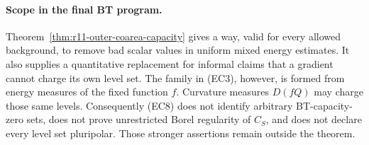 \paragraph{Scope in the final BT program.}
Theorem~\ref{thm:r11-outer-coarea-capacity} gives a way, valid for every allowed background, to remove bad
scalar values in uniform mixed energy estimates.  It also supplies a quantitative replacement
for informal claims that a gradient cannot charge its own
level set.  The family in (EC3), however, is formed from
energy measures of the fixed function $f$.  Curvature measures
$D(fQ)$ may charge those same levels.  Consequently (EC8)
does not identify arbitrary BT-capacity-zero sets, does not
prove unrestricted Borel regularity of $C_S$, and does not
declare every level set pluripolar.  Those stronger assertions
remain outside the theorem.
